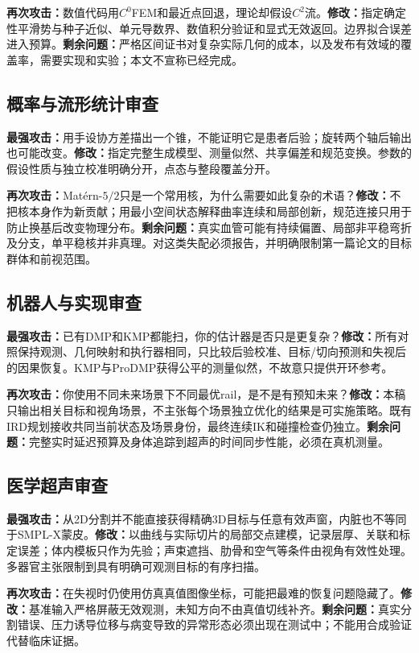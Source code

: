 \documentclass[UTF8,11pt,a4paper,fontset=fandol]{ctexart}
\numberwithin{equation}{section}
\theoremstyle{plain}
\theoremstyle{definition}
\theoremstyle{remark}
\begin{document}
\textbf{再次攻击：}数值代码用$C^0$FEM和最近点回退，理论却假设$C^2$流。\textbf{修改：}指定确定性平滑势与种子近似、单元导数界、数值积分验证和显式无效返回。边界拟合误差进入预算。\textbf{剩余问题：}严格区间证书对复杂实际几何的成本，以及发布有效域的覆盖率，需要实现和实验；本文不宣称已经完成。

\subsection{概率与流形统计审查}
\textbf{最强攻击：}用手设协方差描出一个锥，不能证明它是患者后验；旋转两个轴后输出也可能改变。\textbf{修改：}指定完整生成模型、测量似然、共享偏差和规范变换。参数的假设性质与独立校准明确分开，点态与整段覆盖分开。

\textbf{再次攻击：}Mat\'ern-$5/2$只是一个常用核，为什么需要如此复杂的术语？\textbf{修改：}不把核本身作为新贡献；用最小空间状态解释曲率连续和局部创新，规范连接只用于防止换基后改变物理分布。\textbf{剩余问题：}真实血管可能有持续偏置、局部非平稳弯折及分支，单平稳核并非真理。对这类失配必须报告，并明确限制第一篇论文的目标群体和前视范围。

\subsection{机器人与实现审查}
\textbf{最强攻击：}已有DMP和KMP都能扫，你的估计器是否只是更复杂？\textbf{修改：}所有对照保持观测、几何映射和执行器相同，只比较后验校准、目标/切向预测和失视后的因果恢复。KMP与ProDMP获得公平的测量似然，不故意只提供开环参考。

\textbf{再次攻击：}你使用不同未来场景下不同最优rail，是不是有预知未来？\textbf{修改：}本稿只输出相关目标和视角场景，不主张每个场景独立优化的结果是可实施策略。既有IRD规划接收共同当前状态及场景身份，最终连续IK和碰撞检查仍独立。\textbf{剩余问题：}完整实时延迟预算及身体追踪到超声的时间同步性能，必须在真机测量。

\subsection{医学超声审查}
\textbf{最强攻击：}从2D分割并不能直接获得精确3D目标与任意有效声窗，内脏也不等同于SMPL-X蒙皮。\textbf{修改：}以曲线与实际切片的局部交点建模，记录层厚、关联和标定误差；体内模板只作为先验；声束遮挡、肋骨和空气等条件由视角有效性处理。多器官主张限制到具有明确可观测目标的有序扫描。

\textbf{再次攻击：}在失视时仍使用仿真真值图像坐标，可能把最难的恢复问题隐藏了。\textbf{修改：}基准输入严格屏蔽无效观测，未知方向不由真值切线补齐。\textbf{剩余问题：}真实分割错误、压力诱导位移与病变导致的异常形态必须出现在测试中；不能用合成验证代替临床证据。
\end{document}
